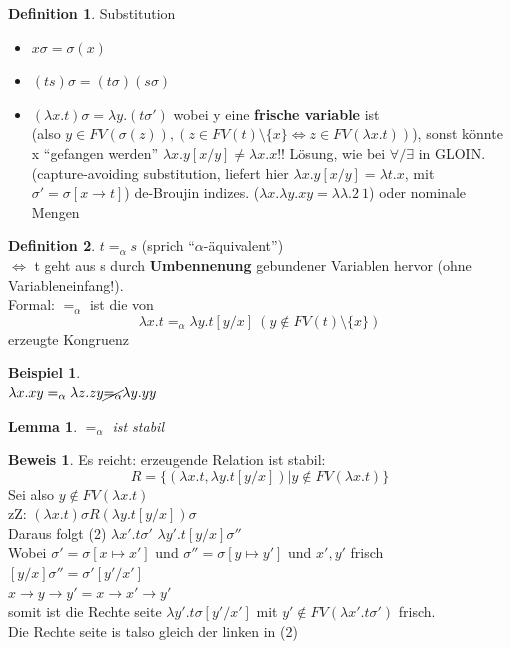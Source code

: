 \documentclass{article}
\newtheorem{lemma}{Lemma}[section]
\theoremstyle{definition}
\newtheorem{beweis}{Beweis}[section]
\newtheorem{beispiel}{Beispiel}[section]
\newtheorem{definition}{Definition}[section]
\begin{document}
	\begin{definition} Substitution\\
	\begin{itemize}
		\item $x\sigma = \sigma(x)$
		\item $(ts)\sigma = (t\sigma)(s\sigma)$
		\item $(\lambda x.t)\sigma = \lambda y.(t\sigma')$ wobei y eine \textbf{frische variable} ist\\
		(also $y\in FV(\sigma(z)), (z\in FV(t)\setminus\{x\}\iff z\in FV(\lambda x.t))$), sonst könnte x ``gefangen werden'' $\lambda x.y [x/y]\neq \lambda x.x$!! Lösung, wie bei $\forall/\exists$ in GLOIN. (capture-avoiding substitution, liefert hier $\lambda x.y [x/y] = \lambda t.x$, mit $\sigma' =\sigma[x\to t]$) de-Broujin indizes. ($\lambda x.\lambda y. xy= \lambda\lambda. 2\ 1$) oder nominale Mengen\cite{nominaleMengen}
	\end{itemize}
	\end{definition}
	\begin{definition}	$t=_\alpha s$ (sprich ``$\alpha$-äquivalent'')\\
	$\iff $ t geht aus  s durch\textbf{ Umbennenung} gebundener Variablen hervor (ohne Variableneinfang!).\\
	Formal: $=_\alpha$ ist die von
	\[\lambda x.t =_\alpha \lambda y.t[y/x]\: (y\notin FV(t)\setminus\{x\})\]
	erzeugte Kongruenz
	\end{definition}
	\begin{beispiel}\ \\
	$\lambda x.xy =_\alpha \lambda z.zy \cancel{=_\alpha} \lambda y.yy$
	\end{beispiel}
	\begin{lemma} $=_\alpha$ ist stabil
	\end{lemma}
	\begin{beweis} Es reicht: erzeugende Relation ist stabil:\\
	\[R=\{(\lambda x.t, \lambda y.t[y/x])|y\notin FV(\lambda x.t)\}\]
	Sei also $y\notin  FV(\lambda x.t)$\\
	zZ: $(\lambda x.t)\sigma R (\lambda y.t[y/x])\sigma$\\
	Daraus folgt (2) $\lambda x'.t\sigma'$ $\lambda y'.t[y/x]\sigma''$\\
	Wobei $\sigma' = \sigma[x\mapsto x']$ und $\sigma'' = \sigma[y\mapsto y']$ und $x',y'$ frisch\\
	$[y/x]\sigma'' = \sigma'[y'/x']$\\
	$x\to y\to y' = x\to x'\to y'$\\
	somit ist die Rechte seite $\lambda y'.t\sigma [y'/x']$ mit $y'\notin FV(\lambda x'.t\sigma')$ frisch.\\
	Die Rechte seite is talso gleich der linken in (2)\\
	\end{beweis}
\end{document}
